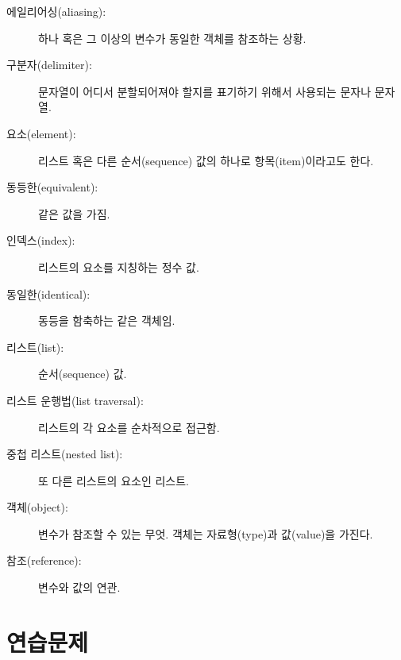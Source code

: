 \begin{description}

\item[에일리어싱(aliasing):] 하나 혹은 그 이상의 변수가 동일한 객체를 참조하는 상황.

\item[구분자(delimiter):] 문자열이 어디서 분할되어져야 할지를 표기하기 위해서 사용되는 문자나 문자열.

\item[요소(element):] 리스트 혹은 다른 순서(sequence) 값의 하나로 항목(item)이라고도 한다.

\item[동등한(equivalent):] 같은 값을 가짐.

\item[인덱스(index):] 리스트의 요소를 지칭하는 정수 값.

\item[동일한(identical):] 동등을 함축하는 같은 객체임.

\item[리스트(list):] 순서(sequence) 값.

\item[리스트 운행법(list traversal):] 리스트의 각 요소를 순차적으로 접근함.

\item[중첩 리스트(nested list):] 또 다른 리스트의 요소인 리스트.

\item[객체(object):] 변수가 참조할 수 있는 무엇. 객체는 자료형(type)과 값(value)을 가진다.

\item[참조(reference):] 변수와 값의 연관.

\end{description}


\section{연습문제}

